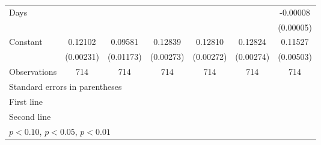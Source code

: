 \begin{table}[htbp]
\begin{tabular}{l*{6}{c}}
\addlinespace
Days                &                     &                     &                     &                     &                     &    -0.00008         \\
                    &                     &                     &                     &                     &                     &   (0.00005)         \\
\addlinespace
Constant            &     0.12102\sym{***}&     0.09581\sym{***}&     0.12839\sym{***}&     0.12810\sym{***}&     0.12824\sym{***}&     0.11527\sym{***}\\
                    &   (0.00231)         &   (0.01173)         &   (0.00273)         &   (0.00272)         &   (0.00274)         &   (0.00503)         \\
\midrule
Observations        &         714         &         714         &         714         &         714         &         714         &         714         \\
\bottomrule
\multicolumn{7}{l}{\footnotesize Standard errors in parentheses}\\
\multicolumn{7}{l}{\footnotesize First line}\\
\multicolumn{7}{l}{\footnotesize Second line}\\
\multicolumn{7}{l}{\footnotesize \sym{*} \(p<0.10\), \sym{**} \(p<0.05\), \sym{***} \(p<0.01\)}\\
\end{tabular}
\end{table}

